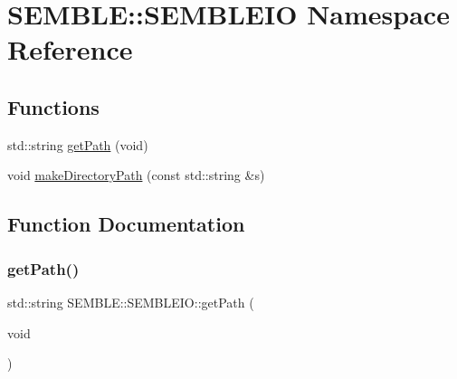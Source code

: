 \hypertarget{namespaceSEMBLE_1_1SEMBLEIO}{}\section{S\+E\+M\+B\+LE\+:\+:S\+E\+M\+B\+L\+E\+IO Namespace Reference}
\label{namespaceSEMBLE_1_1SEMBLEIO}
\subsection*{Functions}
\begin{DoxyCompactItemize}
\item 
std\+::string \mbox{\hyperlink{namespaceSEMBLE_1_1SEMBLEIO_a33874c7b50e9151f263de780862fa2a0}{get\+Path}} (void)
\item 
void \mbox{\hyperlink{namespaceSEMBLE_1_1SEMBLEIO_a522b094bf70472aca4f1875006d8568d}{make\+Directory\+Path}} (const std\+::string \&s)
\end{DoxyCompactItemize}


\subsection{Function Documentation}
\mbox{\label{namespaceSEMBLE_1_1SEMBLEIO_a33874c7b50e9151f263de780862fa2a0}} 
\subsubsection{\texorpdfstring{getPath()}{getPath()}}
{\footnotesize\ttfamily std\+::string S\+E\+M\+B\+L\+E\+::\+S\+E\+M\+B\+L\+E\+I\+O\+::get\+Path (\begin{DoxyParamCaption}\item[{void}]{ }\end{DoxyParamCaption})}

